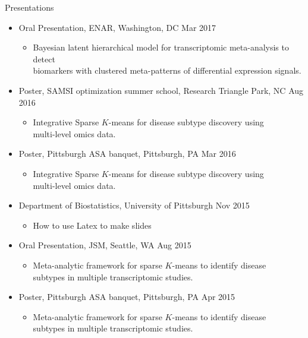 \documentclass{resume} %
\begin{document}
\begin{rSection}{Presentations}
\begin{itemize}[noitemsep,topsep=0pt]
\item Oral Presentation, ENAR, Washington, DC \hfill {Mar 2017}
\begin{itemize}[noitemsep,topsep=0pt]
\item{Bayesian latent hierarchical model for transcriptomic meta-analysis to detect\\ biomarkers with clustered meta-patterns of differential expression signals.}
\end{itemize}




\item Poster, SAMSI optimization summer school,  Research Triangle Park, NC  \hfill {Aug 2016}
\begin{itemize}[noitemsep,topsep=0pt]
\item{Integrative Sparse $K$-means for disease subtype discovery using \\multi-level omics data.}
\end{itemize}

\item Poster, Pittsburgh ASA banquet, Pittsburgh, PA \hfill {Mar 2016}
\begin{itemize}[noitemsep,topsep=0pt]
\item{Integrative Sparse $K$-means for disease subtype discovery using \\multi-level omics data.}
\end{itemize}

\item Department of Biostatistics, University of Pittsburgh  \hfill Nov 2015
\begin{itemize}[noitemsep,topsep=0pt]
\item{How to use Latex to make slides}
\end{itemize}

\item Oral Presentation, JSM, Seattle, WA \hfill {Aug 2015}
\begin{itemize}[noitemsep,topsep=0pt]
\item{Meta-analytic framework for sparse $K$-means to identify disease\\ subtypes in multiple transcriptomic studies.}
\end{itemize}

\item Poster, Pittsburgh ASA banquet, Pittsburgh, PA \hfill {Apr 2015}
\begin{itemize}[noitemsep,topsep=0pt]
\item{Meta-analytic framework for sparse $K$-means to identify disease\\ subtypes in multiple transcriptomic studies.}
\end{itemize}


\end{itemize}
\end{rSection}
\end{document}

